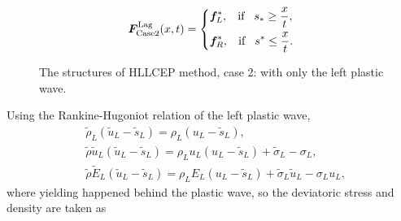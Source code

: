 \documentclass{article}
\numberwithin{equation}{section}
\numberwithin{table}{section}
\begin{document}
\begin{equation}
	\bm{F}^{\text{Lag}}_{\text{Case2}}(x,t) = \left\{ \begin{aligned}
		& \bm{f}_L^*, \hspace{0.3cm} \text{if} \hspace{0.3cm} s_*\ge \frac{x}{t},\\
		& \bm{f}_R^*, \hspace{0.3cm} \text{if} \hspace{0.3cm} s^*\le \frac{x}{t}.\\
	  \end{aligned}
	\right.
  \end{equation}


 \begin{figure}
   \centering 
{}
\caption{The  structures of HLLCEP method, case 2: with only  the left plastic wave.}
\label{fig:case2}
\end{figure}
 Using the Rankine-Hugoniot relation of  the left  plastic wave,
  \begin{align}
	&\widetilde{\rho}_L(\widetilde{u}_L-\widetilde{s}_L) = \rho_L(u_L-\widetilde{s}_L), \label{eq:RHp1}\\
	&\widetilde{\rho}\widetilde{u}_L(\widetilde{u}_L-\widetilde{s}_L) = \rho_Lu_L(u_L-\widetilde{s}_L)+\widetilde{\sigma}_L-\sigma_L,  \label{eq:RHp2}\\
	&\widetilde{\rho}\widetilde{E}_L(\widetilde{u}_L-\widetilde{s}_L) = \rho_LE_L(u_L-\widetilde{s}_L)+\widetilde{\sigma}_L \widetilde{u}_L-\sigma_Lu_L, \label{eq:RHp3}
\end{align}
where yielding happened behind the plastic wave, so the deviatoric stress and density are taken as  
\end{document}

